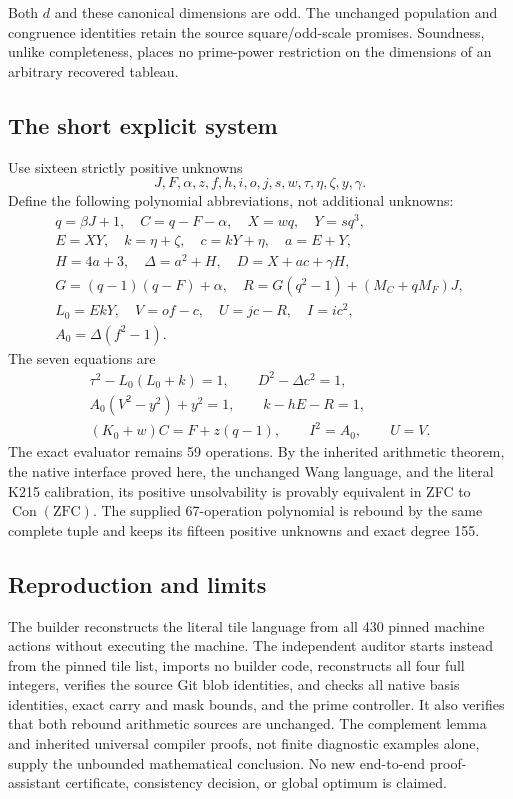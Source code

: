 Both $d$ and these canonical dimensions are odd.  The unchanged population
and congruence identities retain the source square/odd-scale promises.
Soundness, unlike completeness, places no prime-power restriction on the
dimensions of an arbitrary recovered tableau.

\subsection{The short explicit system}
Use sixteen strictly positive unknowns
\[
 J,F,\alpha,z,f,h,i,o,j,s,w,\tau,\eta,\zeta,y,\gamma.
\]
Define the following polynomial abbreviations, not additional unknowns:
\begin{gather*}
q=\beta J+1,\quad C=q-F-\alpha,\quad X=wq,\quad Y=sq^3,\\
E=XY,\quad k=\eta+\zeta,\quad c=kY+\eta,\quad a=E+Y,\\
H=4a+3,\quad \Delta=a^2+H,\quad D=X+ac+\gamma H,\\
G=(q-1)(q-F)+\alpha,\quad R=G(q^2-1)+(M_C+qM_F)J,\\
L_0=EkY,\quad V=of-c,\quad U=jc-R,\quad I=ic^2,\\
A_0=\Delta(f^2-1).
\end{gather*}
The seven equations are
\begin{gather*}
 \tau^2-L_0(L_0+k)=1,\qquad D^2-\Delta c^2=1,\\
 A_0(V^2-y^2)+y^2=1,\qquad k-hE-R=1,\\
 (K_0+w)C=F+z(q-1),\qquad I^2=A_0,\qquad U=V.
\end{gather*}
The exact evaluator remains 59 operations.  By the inherited arithmetic
theorem, the native interface proved here, the unchanged Wang language,
and the literal K215 calibration, its positive unsolvability is provably
equivalent in ZFC to $\operatorname{Con}(\mathrm{ZFC})$.  The supplied
67-operation polynomial is rebound by the same complete tuple and keeps
its fifteen positive unknowns and exact degree 155.

\subsection{Reproduction and limits}
The builder reconstructs the literal tile language from all 430 pinned
machine actions without executing the machine.  The independent auditor
starts instead from the pinned tile list, imports no builder code,
reconstructs all four full integers, verifies the source Git blob identities,
and checks all native basis identities, exact carry and mask bounds, and
the prime controller.  It also verifies that both rebound arithmetic
sources are unchanged.  The complement lemma and inherited universal
compiler proofs, not finite diagnostic examples alone, supply the
unbounded mathematical conclusion.  No new end-to-end proof-assistant
certificate, consistency decision, or global optimum is claimed.
